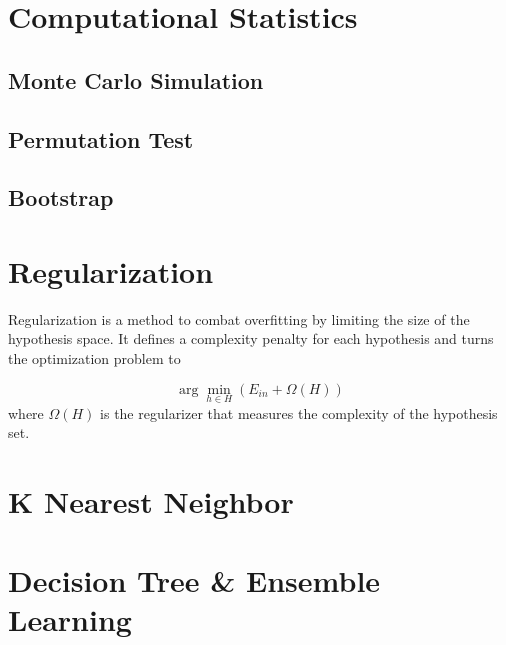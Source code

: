 \documentclass[9pt]{article}
\begin{document}
\newpage
\section{Computational Statistics}
\subsection{Monte Carlo Simulation}
\subsection{Permutation Test}
\subsection{Bootstrap}

\newpage
\section{Regularization}

Regularization is a method to combat overfitting by limiting the size of the hypothesis space. It defines a complexity penalty for each hypothesis and turns the optimization problem to 

$$
\arg \min_{h\in H} (E_{in} + \Omega(H))
$$
where $\Omega(H)$ is the regularizer that measures the complexity of the hypothesis set.

\section{K Nearest Neighbor}

\section{Decision Tree \& Ensemble Learning}
\end{document}
